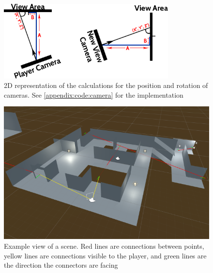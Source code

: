	\begin{figure}[h]
		\label{design:fig:maths}
		\includegraphics[width=0.8\textwidth]{Images/Position}
		\centering
		\caption{2D representation of the calculations for the position and rotation of cameras.
			See \autoref{appendix:code:camera} for the implementation}
	\end{figure}

	\begin{figure}[h]
		\label{design:fig:scene}
		\includegraphics[width=1\textwidth]{Images/Lines_Everywhere2}
		\centering
		\caption{Example view of a scene.
			Red lines are connections between points,
			yellow lines are connections visible to the player,
			and green lines are the direction the connectors are facing}
	\end{figure}

